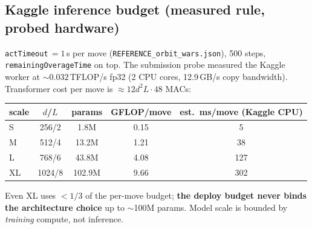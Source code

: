 \documentclass[11pt]{article}
\newcommand{\cd}[1]{\texttt{#1}}
\begin{document}
\subsection{Kaggle inference budget (measured rule, probed hardware)}
\cd{actTimeout}\,$=1$\,s per move (\cd{REFERENCE\_orbit\_wars.json}), 500 steps,
\cd{remainingOverageTime} on top. The submission probe measured the Kaggle worker at
$\sim 0.032$\,TFLOP/s fp32 (2 CPU cores, 12.9\,GB/s copy bandwidth). Transformer cost per move is
$\approx 12 d^2 L \cdot 48$ MACs:

\begin{center}\small
\begin{tabular}{@{}lcccc@{}}
\toprule
scale & $d$/$L$ & params & GFLOP/move & est.\ ms/move (Kaggle CPU) \\
\midrule
S  & 256/2  & 1.8M   & 0.15 & 5   \\
M  & 512/4  & 13.2M  & 1.21 & 38  \\
L  & 768/6  & 43.8M  & 4.08 & 127 \\
XL & 1024/8 & 102.9M & 9.66 & 302 \\
\bottomrule
\end{tabular}
\end{center}

\noindent Even XL uses $<\!1/3$ of the per-move budget; \textbf{the deploy budget never binds the
architecture choice} up to $\sim$100M params. Model scale is bounded by \emph{training} compute, not
inference.
\end{document}
